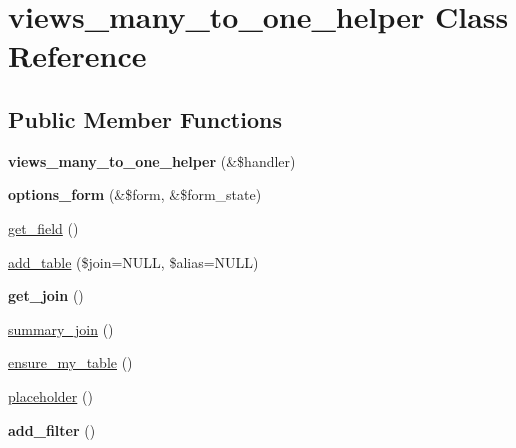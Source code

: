 \hypertarget{classviews__many__to__one__helper}{
\section{views\_\-many\_\-to\_\-one\_\-helper Class Reference}
\label{classviews__many__to__one__helper}
}
\subsection*{Public Member Functions}
\begin{DoxyCompactItemize}
\item 
\hypertarget{classviews__many__to__one__helper_a58c262d5acd10448d1e8c622a289e686}{
{\bfseries views\_\-many\_\-to\_\-one\_\-helper} (\&\$handler)}
\label{classviews__many__to__one__helper_a58c262d5acd10448d1e8c622a289e686}

\item 
\hypertarget{classviews__many__to__one__helper_a5eb7db6defcb30765c434f14a6b5259f}{
{\bfseries options\_\-form} (\&\$form, \&\$form\_\-state)}
\label{classviews__many__to__one__helper_a5eb7db6defcb30765c434f14a6b5259f}

\item 
\hyperlink{classviews__many__to__one__helper_af428c1a384a446883d9c862e1a5a35d1}{get\_\-field} ()
\item 
\hyperlink{classviews__many__to__one__helper_a0d8f88cfcc6bbb792c0fd0b3e1f42882}{add\_\-table} (\$join=NULL, \$alias=NULL)
\item 
\hypertarget{classviews__many__to__one__helper_afe4279ec96cff8444484a61fbfbf77ed}{
{\bfseries get\_\-join} ()}
\label{classviews__many__to__one__helper_afe4279ec96cff8444484a61fbfbf77ed}

\item 
\hyperlink{classviews__many__to__one__helper_a3cca1469412856288fcbaa5c1f627192}{summary\_\-join} ()
\item 
\hyperlink{classviews__many__to__one__helper_a5fdd8b532ced88b77fdd90fdb69e1ced}{ensure\_\-my\_\-table} ()
\item 
\hyperlink{classviews__many__to__one__helper_ac1809fab46a1542250cff68bace8497e}{placeholder} ()
\item 
\hypertarget{classviews__many__to__one__helper_a5db83dd480f8a32940cb60833fa785bc}{
{\bfseries add\_\-filter} ()}
\label{classviews__many__to__one__helper_a5db83dd480f8a32940cb60833fa785bc}

\end{DoxyCompactItemize}
